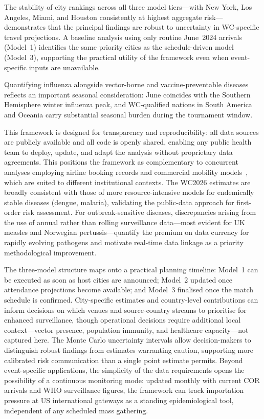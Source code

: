\documentclass[12pt]{article}
\begin{document}
The stability of city rankings across all three model tiers---with New
York, Los Angeles, Miami, and Houston consistently at highest aggregate
risk---demonstrates that the principal findings are robust to uncertainty
in WC-specific travel projections. A baseline analysis using only routine
June~2024 arrivals (Model~1) identifies the same priority cities as the
schedule-driven model (Model~3), supporting the practical utility of the
framework even when event-specific inputs are unavailable.

Quantifying influenza alongside vector-borne and vaccine-preventable
diseases reflects an important seasonal consideration: June coincides
with the Southern Hemisphere winter influenza peak, and WC-qualified
nations in South America and Oceania carry substantial seasonal burden
during the tournament window.

This framework is designed for transparency and reproducibility: all data
sources are publicly available and all code is openly shared, enabling
any public health team to deploy, update, and adapt the analysis without
proprietary data agreements. This positions the framework as
complementary to concurrent analyses employing airline booking records
and commercial mobility models~\cite{epistorm2026}, which are suited to
different institutional contexts. The WC2026 estimates are broadly
consistent with those of more resource-intensive models for endemically
stable diseases (dengue, malaria), validating the public-data approach
for first-order risk assessment. For outbreak-sensitive diseases,
discrepancies arising from the use of annual rather than rolling
surveillance data---most evident for UK measles and Norwegian
pertussis---quantify the premium on data currency for rapidly evolving
pathogens and motivate real-time data linkage as a priority
methodological improvement.

The three-model structure maps onto a practical planning timeline:
Model~1 can be executed as soon as host cities are announced;
Model~2 updated once attendance projections become available; and
Model~3 finalised once the match schedule is confirmed. City-specific
estimates and country-level contributions can inform decisions on which
venues and source-country streams to prioritise for enhanced
surveillance, though operational decisions require additional local
context---vector presence, population immunity, and healthcare
capacity---not captured here. The Monte Carlo uncertainty intervals
allow decision-makers to distinguish robust findings from estimates
warranting caution, supporting more calibrated risk communication than
a single point estimate permits. Beyond event-specific applications,
the simplicity of the data requirements opens the possibility of a
continuous monitoring mode: updated monthly with current COR arrivals
and WHO surveillance figures, the framework can track importation
pressure at US international gateways as a standing epidemiological
tool, independent of any scheduled mass gathering.
\end{document}
